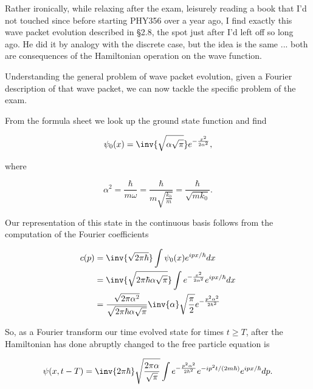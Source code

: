 Rather ironically, while relaxing after the exam, leisurely reading a book \cite{pauli2000wm} that I'd not touched since before starting PHY356 over a year ago, I find exactly this wave packet evolution described in \S 2.8, the spot just after I'd left off so long ago.  He did it by analogy with the discrete case, but the idea is the same ... both are consequences of the Hamiltonian operation on the wave function.

Understanding the general problem of wave packet evolution, given a Fourier description of that wave packet, we can now tackle the specific problem of the exam.

From the formula sheet we look up the ground state function and find

\begin{equation}\label{eqn:qmTwoExamReflection:250}
\psi_0(x) = \inv{\sqrt{\alpha \sqrt{\pi}}} e^{-\frac{x^2}{2\alpha^2}},
\end{equation}

where

\begin{equation}\label{eqn:qmTwoExamReflection:270}
\alpha^2 
= \frac{\hbar}{m \omega}  
= \frac{\hbar}{m \sqrt{\frac{k_0}{m}}}  
= \frac{\hbar}{\sqrt{m k_0}}.
\end{equation}

Our representation of this state in the continuous basis follows from the computation of the Fourier coefficients

\begin{align*}
c(p) 
&= 
\inv{\sqrt{2 \pi \hbar}} \int \psi_0(x) e^{i p x/\hbar} dx \\
&= 
\inv{\sqrt{2 \pi \hbar \alpha \sqrt{\pi}}} 
\int 
e^{-\frac{x^2}{2\alpha^2}}
e^{i p x/\hbar} dx \\
&=
\frac{\sqrt{2 \pi \alpha^2}}{\sqrt{2 \pi \hbar \alpha \sqrt{\pi}}} 
\inv{\alpha} \sqrt{\frac{\pi}{2}}
e^{-\frac{p^2 \alpha^2}{2 \hbar^2}} \\
\end{align*}

So, as a Fourier transform our time evolved state for times $t \ge T$, after the Hamiltonian has done abruptly changed to the free particle equation is

\begin{equation}\label{eqn:qmTwoExamReflection:290}
\psi(x, t - T) = 
\inv{2 \pi \hbar} \sqrt{ \frac{2 \pi \alpha}{\sqrt{\pi}} }
\int
e^{-\frac{p^2 \alpha^2}{2 \hbar^2}} 
e^{-i p^2 t/(2m \hbar)} e^{i p x/\hbar} dp.
\end{equation}

